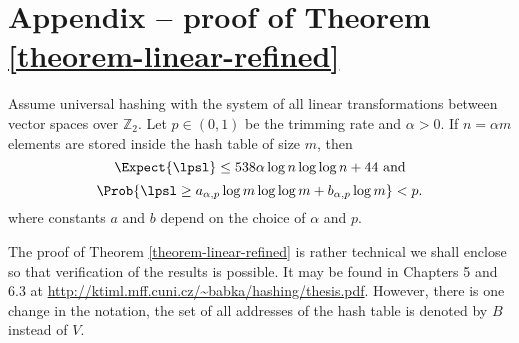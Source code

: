 \section*{Appendix -- proof of Theorem \ref{theorem-linear-refined}}
\setcounter{theorem}{2}

\begin{theorem}
Assume universal hashing with the system of all linear transformations between vector spaces over $\mathbb{Z}_2$. 
Let $p \in (0, 1)$ be the trimming rate and $\alpha > 0$. 
If $n = \alpha m$ elements are stored inside the hash table of size $m$, then $$\Expect{\lpsl} \leq 538 \alpha \log n \log \log n + 44\mbox{ and}$$ $$\Prob{\lpsl \geq a_{\alpha, p} \log m \log \log m + b_{\alpha, p}\log m} < p.$$ where constants $a$ and $b$ depend on the choice of $\alpha$ and $p$.
\end{theorem}

The proof of Theorem \ref{theorem-linear-refined} is rather technical we shall enclose so that verification of the results is possible.
It may be found in Chapters 5 and 6.3 at \url{http://ktiml.mff.cuni.cz/~babka/hashing/thesis.pdf}.
However, there is one change in the notation, the set of all addresses of the hash table is denoted by $B$ instead of $V$.
